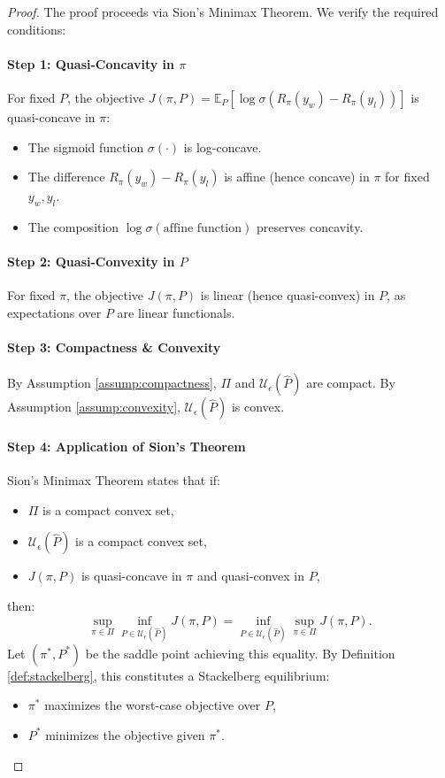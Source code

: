 \begin{proof}
The proof proceeds via Sion's Minimax Theorem. We verify the required conditions:

\paragraph{Step 1: Quasi-Concavity in \( \pi \)}  
For fixed \( P \), the objective \( J(\pi, P) = \mathbb{E}_{P}[\log\sigma(R_\pi(y_w) - R_\pi(y_l))] \) is quasi-concave in \( \pi \):
\begin{itemize}
\item The sigmoid function \( \sigma(\cdot) \) is log-concave.
\item The difference \( R_\pi(y_w) - R_\pi(y_l) \) is affine (hence concave) in \( \pi \) for fixed \( y_w, y_l \).
\item The composition \( \log\sigma(\text{affine function}) \) preserves concavity.
\end{itemize}

\paragraph{Step 2: Quasi-Convexity in \( P \)}  
For fixed \( \pi \), the objective \( J(\pi, P) \) is linear (hence quasi-convex) in \( P \), as expectations over \( P \) are linear functionals.

\paragraph{Step 3: Compactness \& Convexity}  
By Assumption \ref{assump:compactness}, \( \Pi \) and \( \mathcal{U}_\epsilon(\hat{P}) \) are compact. By Assumption \ref{assump:convexity}, \( \mathcal{U}_\epsilon(\hat{P}) \) is convex.

\paragraph{Step 4: Application of Sion's Theorem}  
Sion's Minimax Theorem states that if:
\begin{itemize}
\item \( \Pi \) is a compact convex set,
\item \( \mathcal{U}_\epsilon(\hat{P}) \) is a compact convex set,
\item \( J(\pi, P) \) is quasi-concave in \( \pi \) and quasi-convex in \( P \),
\end{itemize}
then:
\[
\sup_{\pi \in \Pi} \inf_{P \in \mathcal{U}_\epsilon(\hat{P})} J(\pi, P) = \inf_{P \in \mathcal{U}_\epsilon(\hat{P})} \sup_{\pi \in \Pi} J(\pi, P).
\]
Let \( (\pi^*, P^*) \) be the saddle point achieving this equality. By Definition \ref{def:stackelberg}, this constitutes a Stackelberg equilibrium:
\begin{itemize}
\item \( \pi^* \) maximizes the worst-case objective over \( P \),
\item \( P^* \) minimizes the objective given \( \pi^* \).
\end{itemize}
\end{proof}

